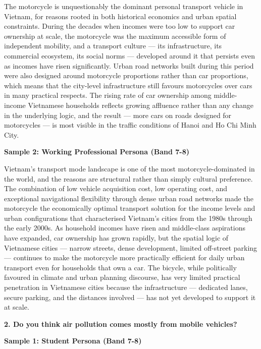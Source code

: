 The motorcycle is unquestionably the dominant personal transport vehicle in Vietnam, for reasons rooted in both historical economics and urban spatial constraints. During the decades when incomes were too low to support car ownership at scale, the motorcycle was the maximum accessible form of independent mobility, and a transport culture — its infrastructure, its commercial ecosystem, its social norms — developed around it that persists even as incomes have risen significantly. Urban road networks built during this period were also designed around motorcycle proportions rather than car proportions, which means that the city-level infrastructure still favours motorcycles over cars in many practical respects. The rising rate of car ownership among middle-income Vietnamese households reflects growing affluence rather than any change in the underlying logic, and the result — more cars on roads designed for motorcycles — is most visible in the traffic conditions of Hanoi and Ho Chi Minh City.

\textbf{Sample 2: Working Professional Persona (Band 7-8)}

Vietnam's transport mode landscape is one of the most motorcycle-dominated in the world, and the reasons are structural rather than simply cultural preference. The combination of low vehicle acquisition cost, low operating cost, and exceptional navigational flexibility through dense urban road networks made the motorcycle the economically optimal transport solution for the income levels and urban configurations that characterised Vietnam's cities from the 1980s through the early 2000s. As household incomes have risen and middle-class aspirations have expanded, car ownership has grown rapidly, but the spatial logic of Vietnamese cities — narrow streets, dense development, limited off-street parking — continues to make the motorcycle more practically efficient for daily urban transport even for households that own a car. The bicycle, while politically favoured in climate and urban planning discourse, has very limited practical penetration in Vietnamese cities because the infrastructure — dedicated lanes, secure parking, and the distances involved — has not yet developed to support it at scale.

\separator

\begin{ieltsquestion}
\textbf{2. Do you think air pollution comes mostly from mobile vehicles?}
\end{ieltsquestion}
\textbf{Sample 1: Student Persona (Band 7-8)}

